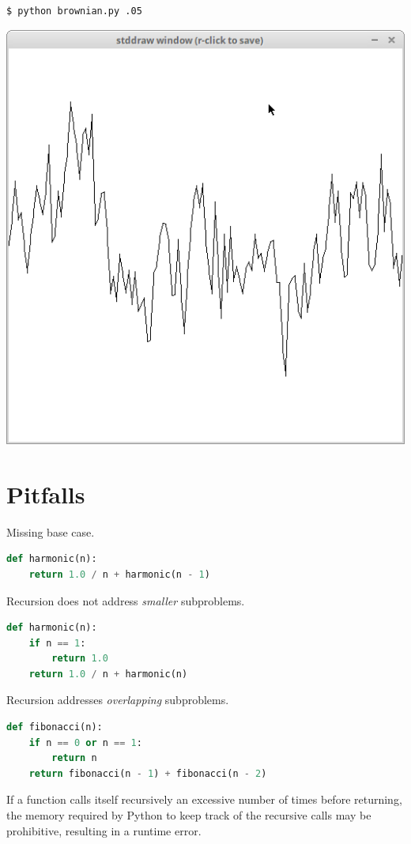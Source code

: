 \documentclass[8pt,a4paper,compress,handout]{beamer}
\begin{document}
\begin{frame}[fragile]
\begin{minipage}{160pt}
\begin{lstlisting}[language={}]
$ python brownian.py .05
\end{lstlisting}
\end{minipage}%
\begin{minipage}{140pt}
\hfill \includegraphics[scale=0.15]{figures/brownian3.png}
\end{minipage}
\end{frame}

\section{Pitfalls}
\begin{frame}[fragile]
Missing base case. 
\begin{lstlisting}[language=Python]
def harmonic(n):
    return 1.0 / n + harmonic(n - 1)
\end{lstlisting}

\bigskip

Recursion does not address \emph{smaller} subproblems.
\begin{lstlisting}[language=Python]
def harmonic(n):
    if n == 1: 
        return 1.0
    return 1.0 / n + harmonic(n)
\end{lstlisting}

\bigskip

Recursion addresses \emph{overlapping} subproblems.
\begin{lstlisting}[language=Python]
def fibonacci(n):
    if n == 0 or n == 1:
        return n
    return fibonacci(n - 1) + fibonacci(n - 2)  
\end{lstlisting}

\bigskip

If a function calls itself recursively an excessive number of times before returning, the memory required by Python to keep track of the recursive calls may be prohibitive, resulting in a runtime error. 
\end{frame}
\end{document}
